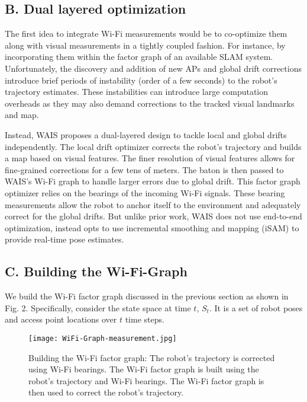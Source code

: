 \documentclass[
	a4paper, %
	11pt, %
	unnumberedsections, %
	twoside, %
]{LTJournalArticle}
\begin{document}
\subsection{B.	Dual layered optimization}
The first idea to integrate Wi-Fi measurements would be to co-optimize them along with visual measurements in a tightly coupled fashion. For instance, by incorporating them within the factor graph of an available SLAM system. Unfortunately, the discovery and addition of new APs and global drift corrections introduce brief periods of instability (order of a few seconds) to the robot’s trajectory estimates. These instabilities can introduce large computation overheads as they may also demand corrections to the tracked visual landmarks and map.

Instead, WAIS proposes a dual-layered design to tackle local and global drifts independently. The local drift optimizer corrects the robot’s trajectory and builds a map based on visual features. The finer resolution of visual features allows for fine-grained corrections for a few tens of meters. The baton is then passed to WAIS’s Wi-Fi graph to handle larger errors due to global drift. This factor graph optimizer relies on the bearings of the incoming Wi-Fi signals. These bearing measurements allow the robot to anchor itself to the environment and adequately correct for the global drifts. But unlike prior work, WAIS does not use end-to-end optimization, instead opts to use incremental smoothing and mapping (iSAM) to provide real-time pose estimates.

\subsection{C.	Building the Wi-Fi-Graph}

We build the Wi-Fi factor graph discussed in the previous section as shown in Fig. 2. Specifically, consider the state space at time $t$, $S_t$. It is a set of robot poses and access point locations over $t$ time steps.

\begin{figure}[h]
	\centering
	\texttt{[image: WiFi-Graph-measurement.jpg]}
	\caption{Building the Wi-Fi factor graph: The robot’s trajectory is corrected using Wi-Fi bearings. The Wi-Fi factor graph is built using the robot’s trajectory and Wi-Fi bearings. The Wi-Fi factor graph is then used to correct the robot’s trajectory.}
	\label{fig:WiFi-Graph-measurement}
\end{figure}
\end{document}
